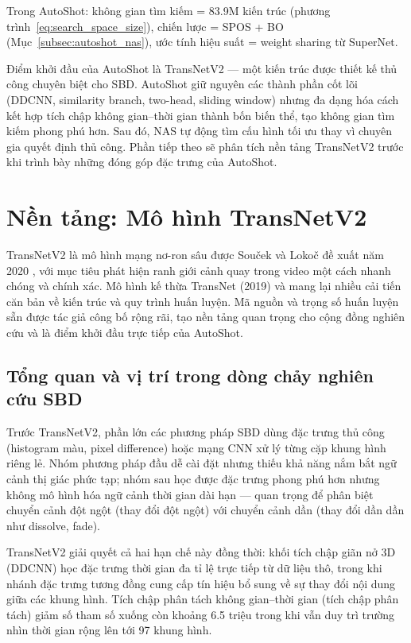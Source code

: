 Trong AutoShot: không gian tìm kiếm = 83.9M kiến trúc (phương trình~\eqref{eq:search_space_size}), chiến lược = SPOS + BO (Mục~\ref{subsec:autoshot_nas}), ước tính hiệu suất = weight sharing từ SuperNet.

Điểm khởi đầu của AutoShot là TransNetV2 — một kiến trúc được thiết kế thủ công chuyên biệt cho SBD. AutoShot giữ nguyên các thành phần cốt lõi (DDCNN, similarity branch, two-head, sliding window) nhưng đa dạng hóa cách kết hợp tích chập không gian–thời gian thành bốn biến thể, tạo không gian tìm kiếm phong phú hơn. Sau đó, NAS tự động tìm cấu hình tối ưu thay vì chuyên gia quyết định thủ công. Phần tiếp theo sẽ phân tích nền tảng TransNetV2 trước khi trình bày những đóng góp đặc trưng của AutoShot.


\section{Nền tảng: Mô hình TransNetV2}
\label{sec:transnetv2}

TransNetV2 là mô hình mạng nơ-ron sâu được Souček và Lokoč đề xuất năm 2020 \cite{soucek2020transnetv2}, với mục tiêu phát hiện ranh giới cảnh quay trong video một cách nhanh chóng và chính xác. Mô hình kế thừa TransNet (2019) và mang lại nhiều cải tiến căn bản về kiến trúc và quy trình huấn luyện. Mã nguồn và trọng số huấn luyện sẵn được tác giả công bố rộng rãi, tạo nền tảng quan trọng cho cộng đồng nghiên cứu và là điểm khởi đầu trực tiếp của AutoShot.

\subsection{Tổng quan và vị trí trong dòng chảy nghiên cứu SBD}
\label{subsec:transnetv2_overview}

Trước TransNetV2, phần lớn các phương pháp SBD dùng đặc trưng thủ công (histogram màu, pixel difference) hoặc mạng CNN xử lý từng cặp khung hình riêng lẻ. Nhóm phương pháp đầu dễ cài đặt nhưng thiếu khả năng nắm bắt ngữ cảnh thị giác phức tạp; nhóm sau học được đặc trưng phong phú hơn nhưng không mô hình hóa ngữ cảnh thời gian dài hạn — quan trọng để phân biệt chuyển cảnh đột ngột (thay đổi đột ngột) với chuyển cảnh dần (thay đổi dần dần như dissolve, fade).

TransNetV2 giải quyết cả hai hạn chế này đồng thời: khối tích chập giãn nở 3D (DDCNN) học đặc trưng thời gian đa tỉ lệ trực tiếp từ dữ liệu thô, trong khi nhánh đặc trưng tương đồng cung cấp tín hiệu bổ sung về sự thay đổi nội dung giữa các khung hình. Tích chập phân tách không gian–thời gian (tích chập phân tách) giảm số tham số xuống còn khoảng 6.5 triệu trong khi vẫn duy trì trường nhìn thời gian rộng lên tới 97 khung hình.

